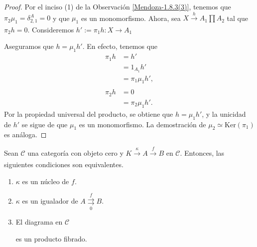 \documentclass[tesis]{subfiles}
\begin{document}
\begin{proof}

    Por el inciso (1) de la Observación \ref{Mendoza-1.8.3(3)}, tenemos que $\pi_2\mu_1=\delta^A_{2,1}=0$ y que $\mu_1$ es un monomorfismo. Ahora, sea $X\xrightarrow[]{h}A_1\prod A_2$ tal que $\pi_2h=0$. Consideremos $h':=\pi_1h:X\to A_1$
    \begin{center}
    \end{center}
    Aseguramos que $h=\mu_1h'$. En efecto, tenemos que
    \begin{align*}
        \pi_1h &= h' \\
               &= 1_{A_1}h' \\
               &= \pi_1\mu_1h', \\ \\
        \pi_2h &= 0 \\
               &= \pi_2\mu_1 h'.
    \end{align*}
    Por la propiedad universal del producto, se obtiene que $h=\mu_1h'$, y la unicidad de $h'$ se sigue de que $\mu_1$ es un monomorfismo. La demostración de $\mu_2\simeq\text{Ker}(\pi_1)$ es análoga.
\end{proof}

\begin{Lema} \label{Mendoza-1.5.2}
    Sean $\mathscr{C}$ una categoría con objeto cero y $K\xrightarrow[]{\kappa}A\xrightarrow[]{f}B$ en $\mathscr{C}$. Entonces, las siguientes condiciones son equivalentes.

    \begin{enumerate}[label=(\alph*)]
        \item $\kappa$ es un núcleo de $f$.

        \item $\kappa$ es un igualador de $A\underset{0}{\overset{f}{\rightrightarrows}}B$.

        \item El diagrama en $\mathscr{C}$
            \begin{center}
            \end{center}
            es un producto fibrado.
    \end{enumerate}
\end{Lema}
\end{document}
